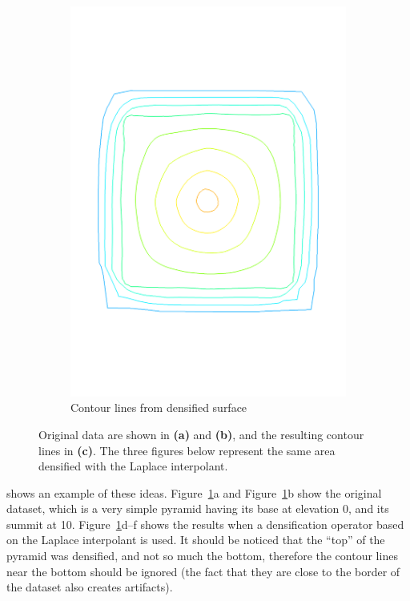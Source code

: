 \begin{figure}
\begin{subfigure}[b]{0.3\linewidth}
    \includegraphics[width=\textwidth]{figs/pyramid_v_cl}
    \caption{Contour lines from densified surface}
  \end{subfigure}  
  \caption{Original data are shown in \textbf{(a)} and \textbf{(b)}, and the resulting contour lines in \textbf{(c)}. The three figures below represent the same area densified with the Laplace interpolant.}
\label{fig:interpol_smooth}
\end{figure}
shows an example of these ideas. 
Figure~\ref{fig:interpol_smooth}a and Figure~\ref{fig:interpol_smooth}b show the original dataset, which is a very simple pyramid having its base at elevation 0, and its summit at 10. 
Figure~\ref{fig:interpol_smooth}d--f shows the results when a densification operator based on the Laplace interpolant is used. 
It should be noticed that the ``top'' of the pyramid was densified, and not so much the bottom, therefore the contour lines near the bottom should be ignored (the fact that they are close to the border of the dataset also creates artifacts).


